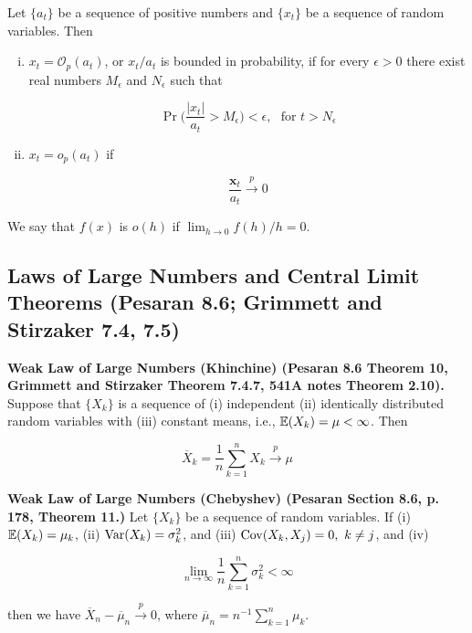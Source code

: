 \begin{definition} Let \(\{a_t\}\) be a sequence of positive numbers and \(\{x_t\}\) be a sequence of random variables. Then

\begin{enumerate}[(i)]

\item \(x_t = \mathcal{O}_p(a_t)\), or \(x_t/a_t\) is bounded in probability, if for every \(\epsilon > 0\) there exist real numbers \(M_\epsilon\) and \(N_\epsilon\) such that

\[
\Pr \bigg( \frac{|x_t|}{a_t} > M_\epsilon \bigg) < \epsilon, \ \ \ \text{for } t > N_\epsilon
\]

\item \(x_t = o_p(a_t)\) if

\[
\frac{\boldsymbol{x}_t}{a_t} \xrightarrow{p} 0
\]

\end{enumerate}
\end{definition}

\begin{definition} We say that \(f(x)\) is \(o(h)\) if \(\lim_{h \to 0} f(h)/h =0\).

\end{definition}

\subsection{Laws of Large Numbers and Central Limit Theorems (Pesaran 8.6; Grimmett and Stirzaker 7.4, 7.5)}

\begin{theorem}\label{asym.wlln} \textbf{Weak Law of Large Numbers (Khinchine) (Pesaran 8.6 Theorem 10, Grimmett and Stirzaker Theorem 7.4.7, 541A notes Theorem 2.10).} Suppose that \(\{X_k\}\) is a sequence of (i) independent (ii) identically distributed random variables with (iii) constant means, i.e., \(\mathbb{E}(X_k) = \mu < \infty\). Then

\[
\overline{X}_k = \frac{1}{n} \sum_{k=1}^n X_k \xrightarrow{p} \mu
\]

\end{theorem}

\begin{theorem}\textbf{Weak Law of Large Numbers (Chebyshev) (Pesaran Section 8.6, p. 178, Theorem 11.)} Let \(\{X_k\}\) be a sequence of random variables. If (i) \(\mathbb{E}(X_k) = \mu_k\), (ii) \(\mathrm{Var}(X_k) = \sigma_k^2\), and (iii) \(\mathrm{Cov}(X_k, X_j) = 0, \ k \neq j\), and (iv)

\[
\lim_{n \to \infty} \frac{1}{n} \sum_{k=1}^n \sigma_k^2 < \infty
\]

then we have \(\overline{X}_n - \overline{\mu}_n \xrightarrow{p} 0\), where \( \overline{\mu}_n = n^{-1} \sum_{k=1}^n \mu_k\).\end{theorem}

